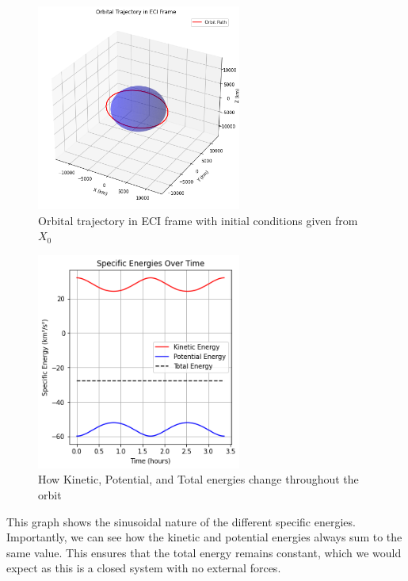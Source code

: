 \documentclass[a4paper, 12pt]{article}  %
\begin{document}
\begin{figure}[H]
    \centering
    \includegraphics[width=0.6\textwidth]{Images/123-3d.png}
    \caption{Orbital trajectory in ECI frame with initial conditions given from $X_0$}
    \label{fig:example}
\end{figure}

\begin{figure}[H]
    \centering
    \includegraphics[width=0.6\textwidth]{Images/124-energies.png}
    \caption{How Kinetic, Potential, and Total energies change throughout the orbit }
    \label{fig:example}
\end{figure}

This graph shows the sinusoidal nature of the different specific energies. Importantly, we can see how the 
kinetic and potential energies always sum to the same value. This ensures that the total energy remains constant, which we would expect 
as this is a closed system with no external forces. 
\end{document}
